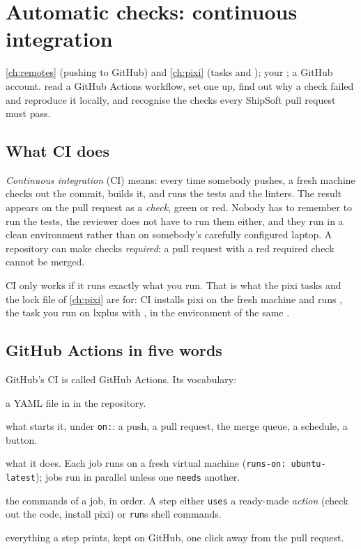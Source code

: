 \chapter{Automatic checks: continuous integration}
\label{ch:ci}

{\cref{ch:remotes} (pushing to GitHub) and \cref{ch:pixi} (tasks and
); your ; a GitHub account.}
{read a GitHub Actions workflow, set one up, find out why a check failed and
reproduce it locally, and recognise the checks every ShipSoft pull request
must pass.}

\section{What CI does}

\emph{Continuous integration} (CI) means: every time somebody pushes, a fresh
machine checks out the commit, builds it, and runs the tests and the
linters. The result appears on the pull request as a \emph{check}, green or
red. Nobody has to remember to run the tests, the reviewer does not have to
run them either, and they run in a clean environment rather than on somebody's
carefully configured laptop. A repository can make checks \emph{required}: a
pull request with a red required check cannot be merged.

CI only works if it runs exactly what you run. That is what the pixi tasks and
the lock file of \cref{ch:pixi} are for: CI installs pixi on the fresh
machine and runs , the task you run on lxplus
with , in the environment of the same .

\section{GitHub Actions in five words}

GitHub's CI is called GitHub Actions. Its vocabulary:

\begin{description}[style=nextline]
  \item[workflow] a YAML file in  in the repository.
  \item[events] what starts it, under \texttt{on:}: a push, a pull request,
    the merge queue, a schedule, a button.
  \item[jobs] what it does. Each job runs on a fresh virtual machine
    (\texttt{runs-on: ubuntu-latest}); jobs run in parallel unless one
    \texttt{needs} another.
  \item[steps] the commands of a job, in order. A step either \texttt{uses}
    a ready-made \emph{action} (check out the code, install pixi) or
    \texttt{run}s shell commands.
  \item[logs] everything a step prints, kept on GitHub, one click away from
    the pull request.
\end{description}

